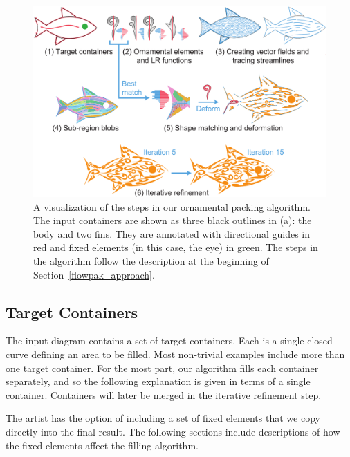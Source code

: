 \begin{figure}[th]
\vspace{-10pt}
\centering
\includegraphics[width=1.0\textwidth]{figures/flowpak/pipeline.pdf} 
\caption[FLOWPAK pipeline]
{\label{fig_flowpak_pipeline} 
A visualization of the steps in our ornamental packing algorithm.
The input containers are shown as three black outlines in (a): the body
and two fins.  They are annotated with directional guides in red and fixed elements (in this 
case, the eye) in green.  The steps in the algorithm follow the
description at the beginning of Section~\ref{flowpak_approach}.
}
\end{figure}

\subsection{Target Containers}
\label{flowpak_target_containers}

The input diagram contains a set of target containers. Each is a single
closed curve defining an area
to be filled.  Most non-trivial examples include more than one target
container.  For the most part, our algorithm fills each container separately,
and so the following explanation is given in terms of a single container.
Containers will later be merged in the iterative refinement step.

The artist has the option of including a set of fixed elements that
we copy directly into the final result. The following sections
include descriptions of how the fixed elements affect the filling
algorithm.

